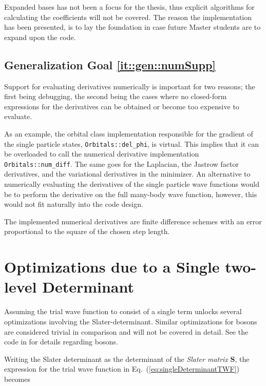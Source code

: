 Expanded bases has not been a focus for the thesis, thus explicit algorithms for calculating the coefficients will not be covered. The reason the implementation has been presented, is to lay the foundation in case future Master students are to expand upon the code.

\subsection{Generalization Goal \ref{it::gen::numSupp}}

Support for evaluating derivatives numerically is important for two reasons; the first being debugging, the second being the cases where no closed-form expressions for the derivatives can be obtained or become too expensive to evaluate.

As an example, the orbital class implementation responsible for the gradient of the single particle states, \verb+Orbitals::del_phi+, is virtual. This implies that it can be overloaded to call the numerical derivative implementation \verb+Orbitals::num_diff+. The same goes for the Laplacian, the Jastrow factor derivatives, and the variational derivatives in the minimizer. An alternative to numerically evaluating the derivatives of the single particle wave functions would be to perform the derivative on the full many-body wave function, however, this would not fit naturally into the code design.

The implemented numerical derivatives are finite difference schemes with an error proportional to the square of the chosen step length.

\section{Optimizations due to a Single two-level Determinant}
\label{sec:optSingleSlater}

Assuming the trial wave function to consist of a single term unlocks several optimizations involving the Slater-determinant. Similar optimizations for bosons are considered trivial in comparison and will not be covered in detail. See the code in \cite{libBorealisCode} for details regarding bosons.

Writing the Slater determinant as the determinant of the \textit{Slater matrix} $\mathbf{S}$, the expression for the trial wave function in Eq.~(\ref{eq:singleDeterminantTWF}) becomes

\newcommand{\PTd}{|\mathbf{S}^\uparrow||\mathbf{S}^\downarrow |J}
\newcommand{\Du}{|\mathbf{S}^\uparrow|}
\newcommand{\Dd}{|\mathbf{S}^\downarrow|}
\newcommand{\Da }{|\mathbf{S}^{\alpha}|}
\newcommand{\Daa}{|\mathbf{S}^{\overline{\alpha}}|}
\newcommand{\PTda}{\Da\Daa J}

